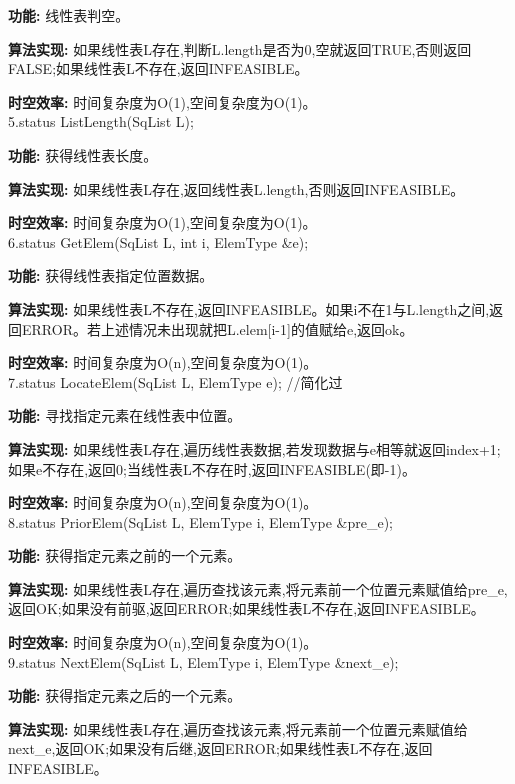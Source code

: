 \documentclass[supercite]{Experimental_Report}
\theoremstyle{definition}
\begin{document}
\textbf{功能: }线性表判空。

\textbf{算法实现: }如果线性表L存在,判断L.length是否为0,空就返回TRUE,否则返回FALSE;如果线性表L不存在,返回INFEASIBLE。

\textbf{时空效率: }时间复杂度为O(1),空间复杂度为O(1)。\\

5.status ListLength(SqList L);

\textbf{功能: }获得线性表长度。

\textbf{算法实现: }如果线性表L存在,返回线性表L.length,否则返回INFEASIBLE。

\textbf{时空效率: }时间复杂度为O(1),空间复杂度为O(1)。\\

6.status GetElem(SqList L, int i, ElemType \&e);

\textbf{功能: }获得线性表指定位置数据。

\textbf{算法实现: }如果线性表L不存在,返回INFEASIBLE。如果i不在1与L.length之间,返回ERROR。若上述情况未出现就把L.elem[i-1]的值赋给e,返回ok。

\textbf{时空效率: }时间复杂度为O(n),空间复杂度为O(1)。\\

7.status LocateElem(SqList L, ElemType e); //简化过

\textbf{功能: }寻找指定元素在线性表中位置。

\textbf{算法实现: }如果线性表L存在,遍历线性表数据,若发现数据与e相等就返回index+1;如果e不存在,返回0;当线性表L不存在时,返回INFEASIBLE(即-1)。

\textbf{时空效率: }时间复杂度为O(n),空间复杂度为O(1)。\\

8.status PriorElem(SqList L, ElemType i, ElemType \&pre\_e);

\textbf{功能: }获得指定元素之前的一个元素。

\textbf{算法实现: }如果线性表L存在,遍历查找该元素,将元素前一个位置元素赋值给pre\_e,返回OK;如果没有前驱,返回ERROR;如果线性表L不存在,返回INFEASIBLE。

\textbf{时空效率: }时间复杂度为O(n),空间复杂度为O(1)。\\

9.status NextElem(SqList L, ElemType i, ElemType \&next\_e);

\textbf{功能: }获得指定元素之后的一个元素。

\textbf{算法实现: }如果线性表L存在,遍历查找该元素,将元素前一个位置元素赋值给next\_e,返回OK;如果没有后继,返回ERROR;如果线性表L不存在,返回INFEASIBLE。
\end{document}
